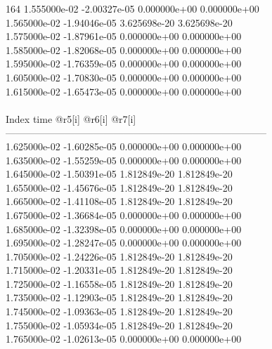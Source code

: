 164	1.555000e-02	-2.00327e-05	0.000000e+00	0.000000e+00	\\ 	1.565000e-02	-1.94046e-05	3.625698e-20	3.625698e-20	\\ 	1.575000e-02	-1.87961e-05	0.000000e+00	0.000000e+00	\\ 	1.585000e-02	-1.82068e-05	0.000000e+00	0.000000e+00	\\ 	1.595000e-02	-1.76359e-05	0.000000e+00	0.000000e+00	\\ 	1.605000e-02	-1.70830e-05	0.000000e+00	0.000000e+00	\\ 	1.615000e-02	-1.65473e-05	0.000000e+00	0.000000e+00	\\ \hline
\\ \hline
Index   time            @r5[i]          @r6[i]          @r7[i]          \\ \hline
--------------------------------------------------------------------------------\\ 	1.625000e-02	-1.60285e-05	0.000000e+00	0.000000e+00	\\ 	1.635000e-02	-1.55259e-05	0.000000e+00	0.000000e+00	\\ 	1.645000e-02	-1.50391e-05	1.812849e-20	1.812849e-20	\\ 	1.655000e-02	-1.45676e-05	1.812849e-20	1.812849e-20	\\ 	1.665000e-02	-1.41108e-05	1.812849e-20	1.812849e-20	\\ 	1.675000e-02	-1.36684e-05	0.000000e+00	0.000000e+00	\\ 	1.685000e-02	-1.32398e-05	0.000000e+00	0.000000e+00	\\ 	1.695000e-02	-1.28247e-05	0.000000e+00	0.000000e+00	\\ 	1.705000e-02	-1.24226e-05	1.812849e-20	1.812849e-20	\\ 	1.715000e-02	-1.20331e-05	1.812849e-20	1.812849e-20	\\ 	1.725000e-02	-1.16558e-05	1.812849e-20	1.812849e-20	\\ 	1.735000e-02	-1.12903e-05	1.812849e-20	1.812849e-20	\\ 	1.745000e-02	-1.09363e-05	1.812849e-20	1.812849e-20	\\ 	1.755000e-02	-1.05934e-05	1.812849e-20	1.812849e-20	\\ 	1.765000e-02	-1.02613e-05	0.000000e+00	0.000000e+00	\\ \hline
